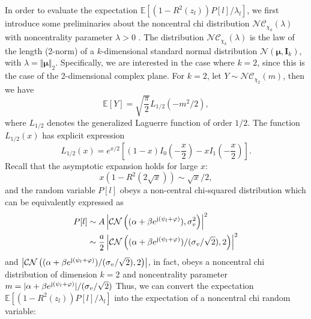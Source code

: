 \documentclass[12pt,draftclsnofoot,journal,onecolumn]{IEEEtran}
\theoremstyle{nonumberplain}
\def \CN {\mathcal{CN}}
\def \nc {\mathcal{NC}}
\begin{document}
    In order to evaluate the expectation $\mathbb{E}[(1-R^2(z_l))P[l]/\lambda_l]$, we first introduce some preliminaries about the noncentral chi distribution $\nc_{\chi_k}(\lambda)$ with noncentrality parameter $\lambda>0$ \cite{krishnan1967noncentral}. The distribution $\nc_{\chi_k}(\lambda)$ is the law of the length (2-norm) of a $k$-dimensional standard normal distribution $\mathcal{N}({\bm \mu}, {\bm I}_k)$, with $\lambda = \Vert {\bm \mu} \Vert_2$. Specifically, we are interested in the case where $k=2$, since this is the case of the 2-dimensional complex plane. For  $k=2$, let $Y \sim \nc_{\chi_2}(m)$, then we have \cite{park1961moments}
    \begin{equation}
        \mathbb{E}\left[Y\right] = \sqrt{\frac{\pi}{2}}L_{1/2}(-m^2/2),
        \label{eqn:noncentral chi mean}
    \end{equation}
    where $L_{1/2}$ denotes the generalized Laguerre function  of order $1/2$. The function $L_{1/2}(x)$ has explicit expression 
    \begin{equation}
        L_{1/2}(x) = e^{x/2}\left[(1-x)I_0\left(-\frac{x}{2}\right)-xI_1\left(-\frac{x}{2}\right) \right].
        \label{eqn:Laguerre half order}
    \end{equation}
    Recall that the asymptotic expansion holds for large $x$:
    \begin{equation}
        x(1-R^2(2\sqrt{x})) \sim \sqrt{x}/2,
        \label{eqn:asym_expansion}
    \end{equation}
    and the random variable $P[l]$ obeys a non-central chi-squared distribution which can be equivalently expressed as 
    \begin{equation}
        \begin{aligned}
        P[l] &\sim A\left| \CN\left( (\alpha + \beta e^{{\rm j} (\psi_l + \varphi)}), \sigma_v^2 \right)\right|^2 \\
        &\sim \frac{a}{2} \left| \CN\left((\alpha + \beta e^{{\rm j} (\psi_l + \varphi)})/(\sigma_v / \sqrt{2}), 2\right)\right|^2\\
        \end{aligned}
    \end{equation}
    and $\left| \CN\left((\alpha + \beta e^{{\rm j} (\psi_l + \varphi)})/(\sigma_v / \sqrt{2}), 2\right)\right|$, in fact, obeys a noncentral chi distribution of dimension $k=2$ and noncentrality parameter $m=\lvert\alpha + \beta e^{{\rm j} (\psi_l + \varphi)}\rvert/(\sigma_v / \sqrt{2})$ Thus, we can convert the expectation  $\mathbb{E}[(1-R^2(z_l))P[l]/\lambda_l]$ into the expectation of a noncentral chi random variable:
\end{document}
